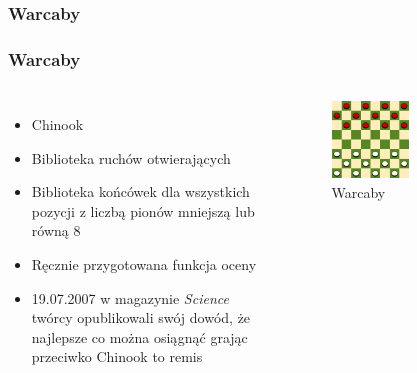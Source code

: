 \documentclass[polish,envcountsect,10pt]{beamer}
\begin{document}
            \subsubsection{Warcaby}
                \begin{frame}
                    \frametitle{Warcaby}
                    \begin{columns}
                        \begin{itemize}
                            \item<1-> Chinook
                            \item<2-> Biblioteka ruchów otwierających
                            \item<3-> Biblioteka końcówek dla wszystkich pozycji z liczbą pionów mniejszą lub równą 8
                            \item<4-> Ręcznie przygotowana funkcja oceny
                            \item<5-> 19.07.2007 w magazynie \textit{Science} twórcy opublikowali swój dowód, że najlepsze co można osiągnąć grając przeciwko Chinook to remis
                        \end{itemize}
                        \begin{figure}[H]
                            \centering
                            \includegraphics[width=0.55\textwidth]{images/checkers}
                            \caption{Warcaby}
                        \end{figure}
                    \end{columns}
                \end{frame}
\end{document}
